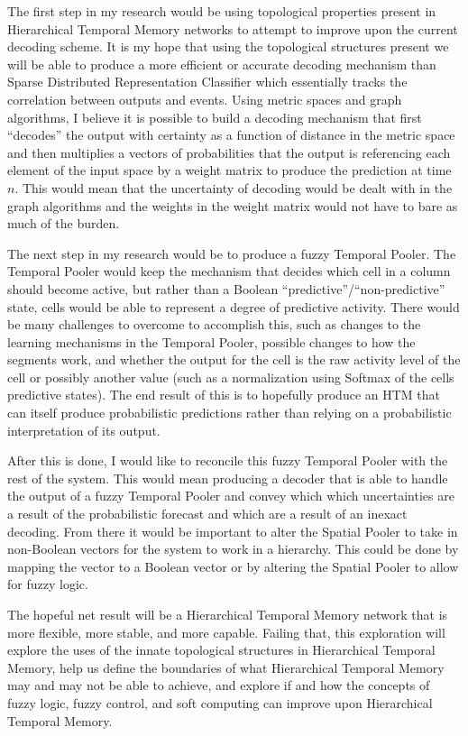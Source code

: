 \documentclass[oneside,12pt,openany]{book}
\begin{document}
	The first step in my research would be using topological properties present in Hierarchical Temporal Memory networks to attempt to improve upon the current decoding scheme. It is my hope that using the topological structures present we will be able to produce a more efficient or accurate decoding mechanism than Sparse Distributed Representation Classifier which essentially tracks the correlation between outputs and events. Using metric spaces and graph algorithms, I believe it is possible to build a decoding mechanism that first ``decodes'' the output with certainty as a function of distance in the metric space and then multiplies a vectors of probabilities that the output is referencing each element of the input space by a weight matrix to produce the prediction at time $n$. This would mean that the uncertainty of decoding would be dealt with in the graph algorithms and the weights in the weight matrix would not have to bare as much of the burden.
	
	The next step in my research would be to produce a fuzzy Temporal Pooler. The Temporal Pooler would keep the mechanism that decides which cell in a column should become active, but rather than a Boolean ``predictive''/``non-predictive'' state, cells would be able to represent a degree of predictive activity. There would be many challenges to overcome to accomplish this, such as changes to the learning mechanisms in the Temporal Pooler, possible changes to how the segments work, and whether the output for the cell is the raw activity level of the cell or possibly another value (such as a normalization using Softmax of the cells predictive states). The end result of this is to hopefully produce an HTM that can itself produce probabilistic predictions rather than relying on a probabilistic interpretation of its output.
	
	After this is done, I would like to reconcile this fuzzy Temporal Pooler with the rest of the system. This would mean producing a decoder that is able to handle the output of a fuzzy Temporal Pooler and convey which which uncertainties are a result of the probabilistic forecast and which are a result of an inexact decoding. From there it would be important to alter the Spatial Pooler to take in non-Boolean vectors for the system to work in a hierarchy. This could be done by mapping the vector to a Boolean vector or by altering the Spatial Pooler to allow for fuzzy logic.
	
	The hopeful net result will be a Hierarchical Temporal Memory network that is more flexible, more stable, and more capable. Failing that, this exploration will explore the uses of the innate topological structures in Hierarchical Temporal Memory, help us define the boundaries of what Hierarchical Temporal Memory may and may not be able to achieve, and explore if and how the concepts of fuzzy logic, fuzzy control, and soft computing can improve upon Hierarchical Temporal Memory.
	
\end{document}
